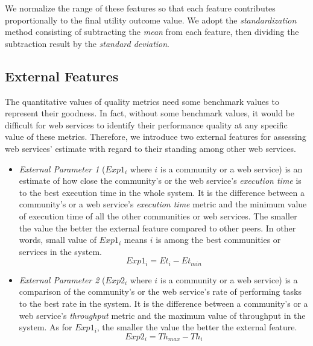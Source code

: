 	We normalize the range of these features so that each feature contributes proportionally to the final utility outcome value. We adopt the \emph{standardization} method consisting of subtracting the \emph{mean} from each feature, then dividing the subtraction result by the \emph{standard deviation}.


\subsection{External Features}\label{s:ef}

The quantitative values of quality metrics need some benchmark values to represent their goodness. In fact, without some benchmark values, it would be difficult for web services to identify their performance quality at any specific value of these metrics. Therefore, we introduce two external features for assessing web services' estimate with regard to their standing among other web services.

\begin{itemize}
  \item \emph{External Parameter 1} ($Exp1_i$ where $i$ is a community or a web service) is an estimate of how close the community's or the web service's \emph{execution time} is to the best execution time in the whole system. It is the difference between a community's or a web service's \emph{execution time} metric and the minimum value of execution time of all the other communities or web services. The smaller the value the better the external feature compared to other peers. In other words, small value of $Exp1_i$ means $i$ is among the best communities or services in the system.
	\begin{equation}\label{exp_1:f}
		Exp1_i = Et_{i} - Et_{min}
	\end{equation}
	\item \emph{External Parameter 2} ($Exp2_i$ where $i$ is a community or a web service)  is a comparison of the community's or the web service's rate of performing tasks to the best rate in the system. It is the difference between a community's or a web service's \emph{throughput} metric and the maximum value of throughput in the system. As for $Exp1_i$, the smaller the value the better the external feature.
	\begin{equation}\label{exp_2Lf}
		Exp2_i = Th_{max} - Th_{i}
	\end{equation}
\end{itemize}


